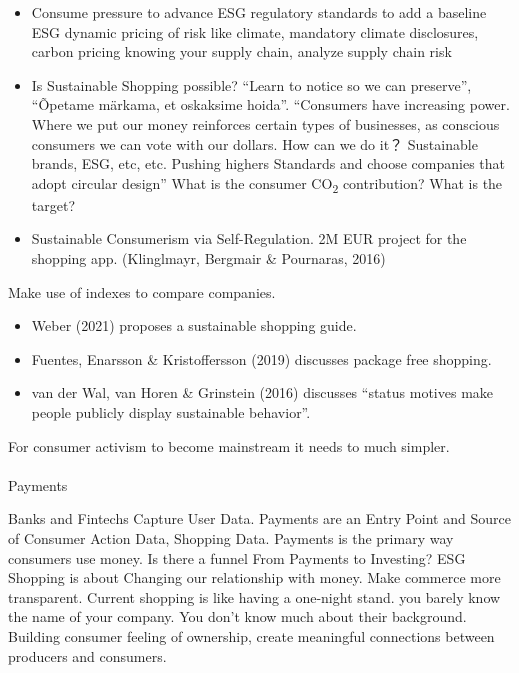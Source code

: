 \documentclass[
  letterpaper,
  DIV=11,
  numbers=noendperiod]{scrartcl}
\makeatletter
\let\oldparagraph\paragraph
\renewcommand{\paragraph}{
    \@ifstar
      \xxxParagraphStar
      \xxxParagraphNoStar
  }
\newcommand{\xxxParagraphStar}[1]{\oldparagraph*{#1}\mbox{}}
\newcommand{\xxxParagraphNoStar}[1]{\oldparagraph{#1}\mbox{}}
\providecommand{\tightlist}{%
  \setlength{\itemsep}{0pt}\setlength{\parskip}{0pt}}\usepackage{longtable,booktabs,array}
\makeatother
\begin{document}
\begin{itemize}
\item
  Consume pressure to advance ESG regulatory standards to add a baseline
  ESG dynamic pricing of risk like climate, mandatory climate
  disclosures, carbon pricing knowing your supply chain, analyze supply
  chain risk
\item
  Is Sustainable Shopping possible? ``Learn to notice so we can
  preserve'', ``Õpetame märkama, et oskaksime hoida''. ``Consumers have
  increasing power. Where we put our money reinforces certain types of
  businesses, as conscious consumers we can vote with our dollars. How
  can we do it？ Sustainable brands, ESG, etc, etc. Pushing highers
  Standards and choose companies that adopt circular design'' What is
  the consumer CO\textsubscript{2} contribution? What is the target?
\item
  Sustainable Consumerism via Self-Regulation. 2M EUR project for the
  shopping app. (Klinglmayr, Bergmair \& Pournaras, 2016)
\end{itemize}

Make use of indexes to compare companies.

\begin{itemize}
\tightlist
\item
  Weber (2021) proposes a sustainable shopping guide.
\item
  Fuentes, Enarsson \& Kristoffersson (2019) discusses package free
  shopping.
\item
  van der Wal, van Horen \& Grinstein (2016) discusses ``status motives
  make people publicly display sustainable behavior''.
\end{itemize}

For consumer activism to become mainstream it needs to much simpler.

\paragraph{Payments}\label{payments}

Banks and Fintechs Capture User Data. Payments are an Entry Point and
Source of Consumer Action Data, Shopping Data. Payments is the primary
way consumers use money. Is there a funnel From Payments to Investing?
ESG Shopping is about Changing our relationship with money. Make
commerce more transparent. Current shopping is like having a one-night
stand. you barely know the name of your company. You don't know much
about their background. Building consumer feeling of ownership, create
meaningful connections between producers and consumers.
\end{document}
